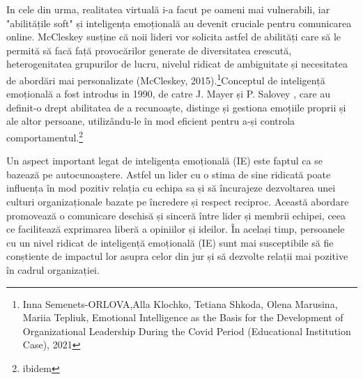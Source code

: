 \documentclass[a4paper, 12pt]{article}
\begin{document}
	\quad In cele din urma,  realitatea virtuală i-a facut pe oameni mai vulnerabili, iar "abilitățile soft" și inteligența emoțională au devenit cruciale pentru comunicarea online. McCleskey susține că noii lideri vor solicita astfel de abilități care să le permită să facă față provocărilor generate de diversitatea crescută, heterogenitatea grupurilor de lucru, nivelul ridicat de ambiguitate și necesitatea de abordări mai personalizate (McCleskey, 2015).\footnote { Inna Semenets-ORLOVA,Alla Klochko, Tetiana Shkoda, Olena Marusina, Mariia Tepliuk, Emotional Intelligence as the Basis for the Development of Organizational Leadership During the Covid Period (Educational Institution Case), 2021}Conceptul de inteligență emoțională a fost introdus in 1990, de catre J. Mayer și P. Salovey , care au definit-o drept abilitatea de a recunoaște, distinge și gestiona emoțiile proprii și ale altor persoane, utilizându-le în mod eficient pentru a-și controla comportamentul.\footnote{ibidem} 

	\quad\quad Un aspect important legat de inteligența emoțională (IE) este faptul ca se bazează pe autocunoaștere. Astfel un lider cu o stima de sine ridicată poate influența în mod pozitiv relația cu echipa sa și să încurajeze dezvoltarea unei culturi organizaționale bazate pe încredere și respect reciproc. Această abordare promovează o comunicare deschisă și sinceră între lider și membrii echipei, ceea ce facilitează exprimarea liberă a opiniilor și ideilor. În același timp, persoanele cu un nivel ridicat de inteligență emoțională (IE) sunt mai susceptibile să fie conștiente de impactul lor asupra celor din jur și să dezvolte relații mai pozitive în cadrul organizației.
\end{document}
